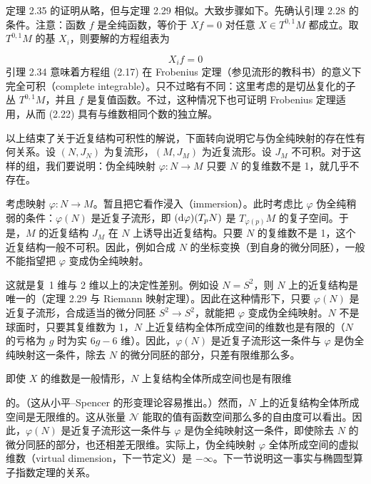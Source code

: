 定理 2.35 的证明从略，但与定理 2.29 相似。大致步骤如下。先确认引理 2.28 的条件。注意：函数 $f$ 是全纯函数，等价于 $Xf=0$ 对任意 $X\in T^{0,1}M$ 都成立。取 $T^{0,1}M$ 的基 $X_i$，则要解的方程组表为

\begin{equation}
  X_if=0 \tag{2.17}
\end{equation}
引理 2.34 意味着方程组 (2.17) 在 Frobenius 定理（参见流形的教科书）的意义下完全可积（complete integrable）。只不过略有不同：这里考虑的是切丛复化的子丛 $T^{0,1}M$，并且 $f$ 是复值函数。不过，这种情况下也可证明 Frobenius 定理适用，从而 (2.22) 具有与维数相同个数的独立解。

以上结束了关于近复结构可积性的解说，下面转向说明它与伪全纯映射的存在性有何关系。设 $(N,J_N)$ 为复流形，$(M,J_M)$ 为近复流形。设 $J_M$ 不可积。对于这样的组，我们要说明：伪全纯映射 $\varphi\colon N\to M$ 只要 $N$ 的复维数不是 1，就几乎不存在。

考虑映射 $\varphi\colon N\to M$。暂且把它看作浸入（immersion）。此时考虑比 $\varphi$ 伪全纯稍弱的条件：$\varphi(N)$ 是近复子流形，即 $(\mathrm{d}\varphi)(T_pN)$ 是 $T_{\varphi(p)}M$ 的复子空间。于是，$M$ 的近复结构 $J_M$ 在 $N$ 上诱导出近复结构。只要 $N$ 的复维数不是 1，这个近复结构一般不可积。因此，例如合成 $N$ 的坐标变换（到自身的微分同胚），一般不能指望把 $\varphi$ 变成伪全纯映射。

这就是复 1 维与 2 维以上的决定性差别。例如设 $N=S^2$，则 $N$ 上的近复结构是唯一的（定理 2.29 与 Riemann 映射定理）。因此在这种情形下，只要 $\varphi(N)$ 是近复子流形，合成适当的微分同胚 $S^2\to S^2$，就能把 $\varphi$ 变成伪全纯映射。$N$ 不是球面时，只要其复维数为 1，$N$ 上近复结构全体所成空间的维数也是有限的（$N$ 的亏格为 $g$ 时为实 $6g-6$ 维）。因此，$\varphi(N)$ 是近复子流形这一条件与 $\varphi$ 是伪全纯映射这一条件，除去 $N$ 的微分同胚的部分，只差有限维那么多。

即使 $X$ 的维数是一般情形，$N$ 上复结构全体所成空间也是有限维

的。（这从小平–Spencer 的形变理论容易推出。）然而，$N$ 上的近复结构全体所成空间是无限维的。这从张量 $\mathcal{N}$ 能取的值有函数空间那么多的自由度可以看出。因此，$\varphi(N)$ 是近复子流形这一条件与 $\varphi$ 是伪全纯映射这一条件，即使除去 $N$ 的微分同胚的部分，也还相差无限维。实际上，伪全纯映射 $\varphi$ 全体所成空间的虚拟维数（virtual dimension，下一节定义）是 $-\infty$。下一节说明这一事实与椭圆型算子指数定理的关系。


